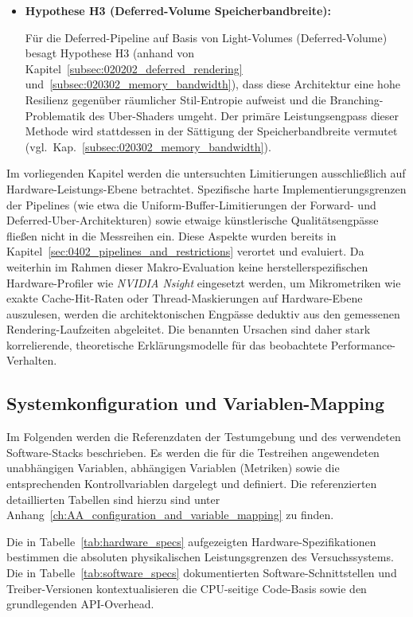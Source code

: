 \begin{itemize}
    \item \hypertarget{hyp:H3}{\textbf{Hypothese H3 (Deferred-Volume Speicherbandbreite):}}
    Für die Deferred-Pipeline auf Basis von Light-Volumes (Deferred-Volume) besagt Hypothese H3
    (anhand von Kapitel~\ref{subsec:020202_deferred_rendering} und~\ref{subsec:020302_memory_bandwidth}), dass diese
    Architektur eine hohe Resilienz gegenüber räumlicher Stil-Entropie aufweist und die Branching-Problematik des
    Uber-Shaders umgeht.
    Der primäre Leistungsengpass dieser Methode wird stattdessen in der Sättigung der Speicherbandbreite vermutet
    (vgl.\ Kap.~\ref{subsec:020302_memory_bandwidth}).
\end{itemize}

Im vorliegenden Kapitel werden die untersuchten Limitierungen ausschließlich auf Hardware-Leistungs-Ebene betrachtet.
Spezifische harte Implementierungsgrenzen der Pipelines (wie etwa die Uniform-Buffer-Limitierungen der Forward- und
Deferred-Uber-Architekturen) sowie etwaige künstlerische Qualitätsengpässe fließen nicht in die Messreihen ein.
Diese Aspekte wurden bereits in Kapitel~\ref{sec:0402_pipelines_and_restrictions} verortet und evaluiert.
Da weiterhin im Rahmen dieser Makro-Evaluation keine herstellerspezifischen Hardware-Profiler wie \textit{NVIDIA Nsight}
eingesetzt werden, um Mikrometriken wie exakte Cache-Hit-Raten oder Thread-Maskierungen auf Hardware-Ebene
auszulesen, werden die architektonischen Engpässe deduktiv aus den gemessenen Rendering-Laufzeiten abgeleitet.
Die benannten Ursachen sind daher stark korrelierende, theoretische Erklärungsmodelle für das beobachtete
Performance-Verhalten.

\subsection{{Systemkonfiguration und Variablen-Mapping}}
\label{subsec:050102_evaluation_configuration_and_variable_mapping}

Im Folgenden werden die Referenzdaten der Testumgebung und des verwendeten Software-Stacks beschrieben.
Es werden die für die Testreihen angewendeten unabhängigen Variablen, abhängigen Variablen (Metriken) sowie die
entsprechenden Kontrollvariablen dargelegt und definiert.
Die referenzierten detaillierten Tabellen sind hierzu sind unter Anhang~\ref{ch:AA_configuration_and_variable_mapping}
zu finden.

Die in Tabelle~\ref{tab:hardware_specs} aufgezeigten Hardware-Spezifikationen bestimmen die absoluten physikalischen
Leistungsgrenzen des Versuchssystems.
Die in Tabelle~\ref{tab:software_specs} dokumentierten Software-Schnittstellen und Treiber-Versionen kontextualisieren
die \ac{CPU}-seitige Code-Basis sowie den grundlegenden \ac{API}-Overhead.


